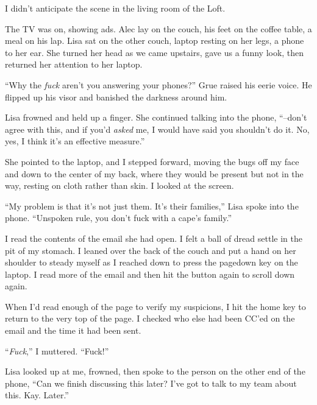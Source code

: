 I didn't anticipate the scene in the living room of the Loft.



The TV was on, showing ads.  Alec lay on the couch, his feet on the coffee table, a meal on his lap.  Lisa sat on the other couch, laptop resting on her legs, a phone to her ear.  She turned her head as we came upstairs, gave us a funny look, then returned her attention to her laptop.



``Why the \emph{fuck} aren't you answering your phones?'' Grue raised his eerie voice.  He flipped up his visor and banished the darkness around him.



Lisa frowned and held up a finger.  She continued talking into the phone, ``--don't agree with this, and if you'd \emph{asked} me, I would have said you shouldn't do it.  No, yes, I think it's an effective measure.''



She pointed to the laptop, and I stepped forward, moving the bugs off my face and down to the center of my back, where they would be present but not in the way, resting on cloth rather than skin.  I looked at the screen.



``My problem is that it's not just them.  It's their families,'' Lisa spoke into the phone.  ``Unspoken rule, you don't fuck with a cape's family.''



I read the contents of the email she had open.  I felt a ball of dread settle in the pit of my stomach.  I leaned over the back of the couch and put a hand on her shoulder to steady myself as I reached down to press the pagedown key on the laptop.  I read more of the email and then hit the button again to scroll down again.



When I'd read enough of the page to verify my suspicions, I hit the home key to return to the very top of the page.  I checked who else had been CC'ed on the email and the time it had been sent.



``\emph{Fuck},'' I muttered.  ``Fuck!''



Lisa looked up at me, frowned, then spoke to the person on the other end of the phone, ``Can we finish discussing this later?  I've got to talk to my team about this.  Kay.  Later.''



